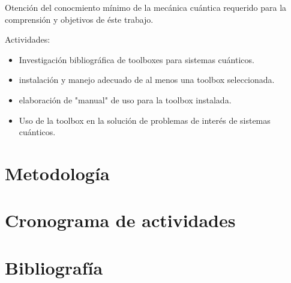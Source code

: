 \documentclass[a4paper]{article}
\begin{document}
  Otención del conocmiento mínimo de la mecánica cuántica
  requerido para la comprensión y objetivos de éste trabajo.

  Actividades:
  \begin{itemize}
    \item Investigación bibliográfica de toolboxes para
      sistemas cuánticos.
    \item instalación y manejo adecuado de al menos una
      toolbox seleccionada.
    \item elaboración de "manual" de uso para la toolbox
      instalada.
    \item Uso de la toolbox en la solución de problemas de
      interés de sistemas cuánticos.
  \end{itemize}
  
  \newpage
  \section{Metodología}

  \newpage
  \section{Cronograma de actividades}

  \newpage
  \section{Bibliografía}
  
\end{document}
